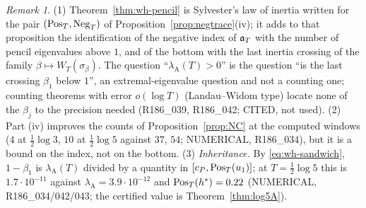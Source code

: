 \documentclass[11pt]{amsart}
\theoremstyle{definition}
\theoremstyle{remark}
\newtheorem{remark}[theorem]{Remark}
\begin{document}

\begin{remark}\label{rem:wh-pencil}
(1) Theorem~\ref{thm:wh-pencil} is Sylvester's law of inertia written for the pair $(\mathrm{Pos}_T,\mathrm{Neg}_T)$ of
Proposition~\ref{prop:negtrace}(iv); it adds to that proposition the identification of the negative
index of $\mathfrak a_T$ with the number of pencil eigenvalues above $1$, and of the bottom with the last inertia
crossing of the family $\beta\mapsto W_T(\sigma_\beta)$. The question ``$\lambda_{\mathrm A}(T)>0$'' is
the question ``is the last crossing $\beta_1$ below $1$'', an extremal-eigenvalue question and not a
counting one; counting theorems with error $o(\log T)$ (Landau--Widom type) locate none of the
$\beta_j$ to the precision needed (R186\_039, R186\_042; CITED, not used).
(2) Part (iv) improves the counts of Proposition~\ref{prop:NC} at the computed windows
($4$ at $\frac12\log3$, $10$ at $\frac12\log5$ against $37$, $54$; NUMERICAL, R186\_034), but it is a bound on
the index, not on the bottom.
(3) \emph{Inheritance.} By \eqref{eq:wh-sandwich}, $1-\beta_1$ is $\lambda_{\mathrm A}(T)$ divided by a quantity
in $[c_P,\mathrm{Pos}_T(u_1)]$; at $T=\frac12\log5$ this is $1.7\cdot10^{-11}$ against $\lambda_{\mathrm A}=3.9\cdot10^{-12}$
and $\mathrm{Pos}_T(h^*)=0.22$ (NUMERICAL, R186\_034/042/043; the certified value is Theorem~\ref{thm:log5A}).
\end{remark}
\end{document}
